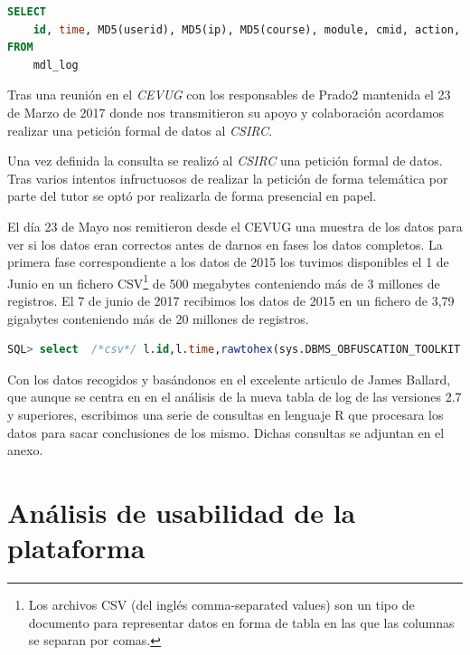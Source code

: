 \begin{lstlisting}[language=sql]
SELECT
    id, time, MD5(userid), MD5(ip), MD5(course), module, cmid, action, url, info
FROM
    mdl_log
\end{lstlisting}


Tras una reunión en el \textit{CEVUG} con los responsables de Prado2 mantenida el 23 de Marzo de 2017 donde nos transmitieron su apoyo y colaboración acordamos realizar una petición formal de datos al \textit{CSIRC}.

Una vez definida la consulta se realizó al \textit{CSIRC} una petición formal de datos. Tras varios intentos infructuosos de realizar la petición de forma telemática por parte del tutor se optó por realizarla de forma presencial en papel.

El día 23 de Mayo nos remitieron desde el CEVUG una muestra de los datos para ver si los datos eran correctos antes de darnos en fases los datos completos. La primera fase correspondiente a los datos de 2015 los tuvimos disponibles el 1 de Junio en un fichero CSV\footnote{Los archivos CSV (del inglés comma-separated values) son un tipo de documento para representar datos en forma de tabla en las que las columnas se separan por comas.} de 500 megabytes conteniendo más de 3 millones de registros. El 7 de junio de 2017 recibimos los datos de 2015 en un fichero de 3,79 gigabytes conteniendo más de 20 millones de registros.

\begin{lstlisting}[language=sql]
SQL> select  /*csv*/ l.id,l.time,rawtohex(sys.DBMS_OBFUSCATION_TOOLKIT.MD5(INPUT_STRING => l.userid)) userid_md5,rawtohex(sys.DBMS_OBFUSCATION_TOOLKIT.MD5(INPUT_STRING => l.ip)) ip_md5 ,l.course, substr(c.idnumber,0,14) course_code,substr(c.idnumber,0,3) tit, substr(c.idnumber,5,2) plan, substr(c.idnumber,8,2) cea, l.module,l.cmid, l.action, l.url, l.info from p_log l, p_course c where (l.course=c.id and l.userid>10 and REGEXP_LIKE(c.idnumber, '^[0-9]') and  l.time>1420070400 and l.time<1451606400);

\end{lstlisting}

Con los datos recogidos y basándonos en el excelente articulo\cite{art_02} de James Ballard, que aunque se centra en en el análisis de la nueva tabla de log de las versiones 2.7 y superiores, escribimos una serie de consultas en lenguaje R que procesara los datos para sacar conclusiones de los mismo. Dichas consultas se adjuntan en el anexo.

\section{Análisis de usabilidad de la plataforma}

